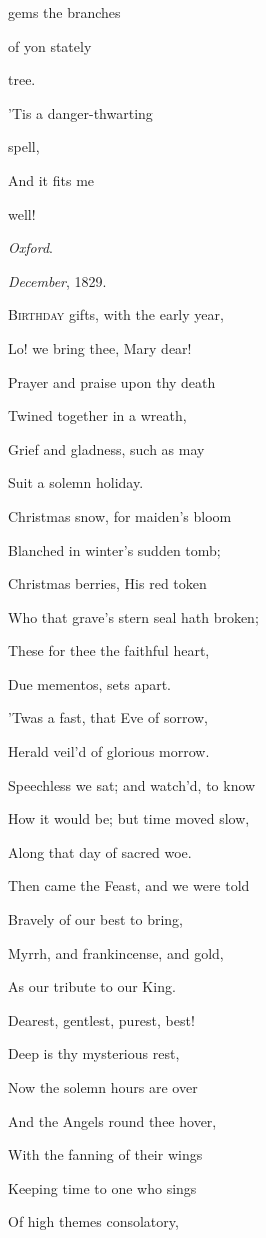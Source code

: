 gems the branches

of yon stately

tree.

'Tis a danger-thwarting

spell,

And it fits me

well!

\emph{Oxford}.

\emph{December}, 1829.


B\textsc{irthday} gifts, with the early year,

Lo! we bring thee, Mary dear!

Prayer and praise upon thy death

Twined together in a wreath,

Grief and gladness, such as may

Suit a solemn holiday.

Christmas snow, for maiden's bloom

Blanched in winter's sudden tomb;

Christmas berries, His red token

Who that grave's stern seal hath broken;

These for thee the faithful heart,

Due mementos, sets apart.

'Twas a fast, that Eve of sorrow,

Herald veil'd of glorious morrow.

Speechless we sat; and watch'd, to know

How it would be; but time moved slow,

Along that day of sacred woe.

Then came the Feast, and we were told

Bravely of our best to bring,

Myrrh, and frankincense, and gold,

As our tribute to our King.

Dearest, gentlest, purest, best!

Deep is thy mysterious rest,

Now the solemn hours are over

And the Angels round thee hover,

With the fanning of their wings

Keeping time to one who sings

Of high themes consolatory,

